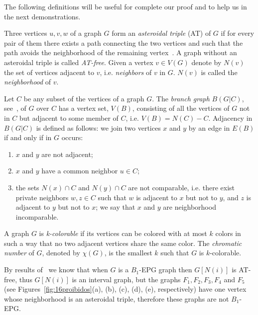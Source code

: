 \documentclass[9pt]{entcs}
\newtheorem{teo}{Theorem}[section]
\begin{document}


The following definitions will be useful for complete our proof and to help us in the next demonstrations.

Three vertices $u, v, w$ of a graph $G$ form an \textit{asteroidal triple} (AT) of $G$ if for every pair of them there exists a path connecting the two vertices and such that the path avoids the neighborhood of the remaining vertex~\cite{Asinowski2009}. A graph without an asteroidal triple is called \textit{AT-free}. Given a vertex $v\in V(G)$ denote by $N(v)$ the set of vertices adjacent to $v$, i.e. \textit{neighbors} of $v$ in $G$. $N(v)$ is called the  \textit{neighborhood} of $v$.

Let $C$ be any subset of the vertices of a graph $G$. The \textit{branch graph} $B(G|C)$, see~\cite{golumbic2009}, of $G$ over $C$ has a vertex set, $V(B)$, consisting of all the vertices of $G$ not in $C$ but adjacent to some member of $C$, i.e. $V(B) = N(C) - C$. Adjacency in $B(G|C)$ is defined as follows: we join two vertices $x$ and $y$ by an edge in $E(B)$ if and only if in $G$ occurs:
\begin{enumerate}
    \item  $x$ and $y$ are not adjacent;
    \item $x$ and $y$ have a common neighbor $u \in C$;
    \item the sets $N(x) \cap C$ and $N(y) \cap C$ are not comparable, i.e. there exist private neighbors $w, z \in C$ such that $w$ is adjacent to $x$ but not to $y$, and $z$ is adjacent to $y$ but not to $x$; we say that $x$ and $y$ are neighborhood incomparable.
\end{enumerate}

A graph $G$ is \textit{k-colorable} if its vertices can be colored with at most $k$ colors in such a way that no two adjacent vertices share the same color. The \textit{chromatic number} of $G$, denoted by $\chi(G)$, is the smallest $k$ such that $G$ is $k$-colorable.


By results of~\cite{ries2009} we know that when $G$ is a $B_1$-EPG graph then $G[N(i)]$ is AT-free, thus $G[N(i)]$ is an interval graph, but the graphs $F_{1}, F_{2}, F_{3}, F_{4}$ and $F_{5}$ (see Figures~\ref{fig:16proibidos}(a), (b), (c), (d), (e), respectively) have one vertex whose neighborhood is an asteroidal triple, therefore these graphs are not  $B_1$-EPG.
\end{document}

